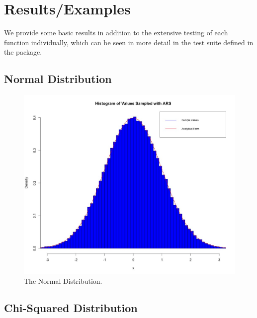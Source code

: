 \documentclass[12pt, oneside]{article}
\begin{document}
\section{Results/Examples}

We provide some basic results in addition to the extensive testing of each function individually, which can be seen in more detail in the test suite defined in the package.

\subsection{Normal Distribution}

\begin{figure}[H]
\centering
  \includegraphics[scale=.25]{figure/normal.jpeg}
  \caption{The Normal Distribution.}
  \label{fig:d1}
\end{figure}

\subsection{Chi-Squared Distribution}
\end{document}
